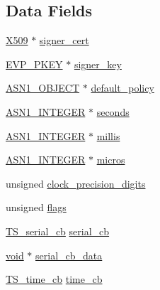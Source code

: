 \subsection*{Data Fields}
\begin{DoxyCompactItemize}
\item 
\hyperlink{crypto_2ossl__typ_8h_a4f666bde6518f95deb3050c54b408416}{X509} $\ast$ \hyperlink{struct_t_s__resp__ctx_a89988d7d5a063ecf3f4780e2527a9b47}{signer\+\_\+cert}
\item 
\hyperlink{crypto_2ossl__typ_8h_a2fca4fef9e4c7a2a739b1ea04acb56ce}{E\+V\+P\+\_\+\+P\+K\+EY} $\ast$ \hyperlink{struct_t_s__resp__ctx_a950fd421a933fc3746212228c461f4fe}{signer\+\_\+key}
\item 
\hyperlink{crypto_2ossl__typ_8h_ae3fda0801e4c8e250087052bafb3ce2e}{A\+S\+N1\+\_\+\+O\+B\+J\+E\+CT} $\ast$ \hyperlink{struct_t_s__resp__ctx_a18df471bd4fb5d58a53927eaa52626ab}{default\+\_\+policy}
\item 
\hyperlink{crypto_2ossl__typ_8h_af4335399bf9774cb410a5e93de65998b}{A\+S\+N1\+\_\+\+I\+N\+T\+E\+G\+ER} $\ast$ \hyperlink{struct_t_s__resp__ctx_ac2918a5dbb5a029747f5fab915d2fe6d}{seconds}
\item 
\hyperlink{crypto_2ossl__typ_8h_af4335399bf9774cb410a5e93de65998b}{A\+S\+N1\+\_\+\+I\+N\+T\+E\+G\+ER} $\ast$ \hyperlink{struct_t_s__resp__ctx_afe1fff95f07a821e65c7cb3e91fc63b0}{millis}
\item 
\hyperlink{crypto_2ossl__typ_8h_af4335399bf9774cb410a5e93de65998b}{A\+S\+N1\+\_\+\+I\+N\+T\+E\+G\+ER} $\ast$ \hyperlink{struct_t_s__resp__ctx_a0b58c483824a9d659c9d66f0513d8b50}{micros}
\item 
unsigned \hyperlink{struct_t_s__resp__ctx_a3edc4d8d7d241b04512e9b014d96eff7}{clock\+\_\+precision\+\_\+digits}
\item 
unsigned \hyperlink{struct_t_s__resp__ctx_a8b08a4d2ec878257d64c55f64a62242c}{flags}
\item 
\hyperlink{include_2openssl_2ts_8h_a3f9e69bb9f4f76ac13e1706bd8763762}{T\+S\+\_\+serial\+\_\+cb} \hyperlink{struct_t_s__resp__ctx_afab1d0413d4938f91b9f65f2fb0fd9e9}{serial\+\_\+cb}
\item 
\hyperlink{hw__4758__cca_8h_afad4d591c7931ff6dc5bf69c76c96aa0}{void} $\ast$ \hyperlink{struct_t_s__resp__ctx_aae7f2102fe915731c090b1e5e277cfeb}{serial\+\_\+cb\+\_\+data}
\item 
\hyperlink{include_2openssl_2ts_8h_a7d7ce5cfdf0ec2c72eabf260ad4b75eb}{T\+S\+\_\+time\+\_\+cb} \hyperlink{struct_t_s__resp__ctx_aaf928e2403d2470c5f3be02fb9bb562d}{time\+\_\+cb}
\item 

\end{DoxyCompactItemize}

